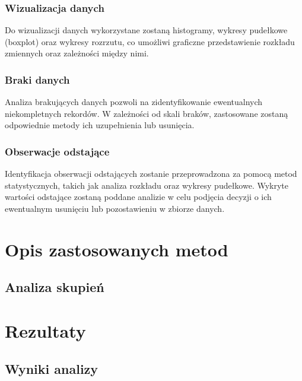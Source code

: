 \documentclass[a4paper,12pt]{article}
\begin{document}
\subsubsection{Wizualizacja danych}
Do wizualizacji danych wykorzystane zostaną histogramy, wykresy pudełkowe (boxplot) oraz wykresy rozrzutu, co umożliwi graficzne przedstawienie rozkładu zmiennych oraz zależności między nimi.


\subsubsection{Braki danych}
Analiza brakujących danych pozwoli na zidentyfikowanie ewentualnych niekompletnych rekordów. W zależności od skali braków, zastosowane zostaną odpowiednie metody ich uzupełnienia lub usunięcia.


\subsubsection{Obserwacje odstające}
Identyfikacja obserwacji odstających zostanie przeprowadzona za pomocą metod statystycznych, takich jak analiza rozkładu oraz wykresy pudełkowe. Wykryte wartości odstające zostaną poddane analizie w celu podjęcia decyzji o ich ewentualnym usunięciu lub pozostawieniu w zbiorze danych.


\section{Opis zastosowanych metod}

\subsection{Analiza skupień}

\section{Rezultaty}

\subsection{Wyniki analizy}
\end{document}
